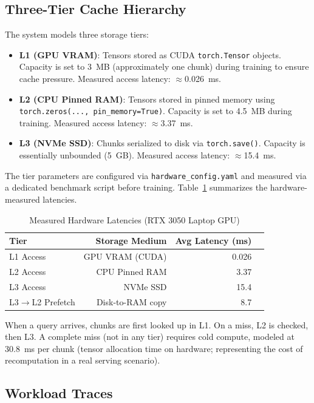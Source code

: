 \documentclass[conference]{IEEEtran}
\begin{document}
\subsection{Three-Tier Cache Hierarchy}

The system models three storage tiers:

\begin{itemize}
    \item \textbf{L1 (GPU VRAM)}: Tensors stored as CUDA \texttt{torch.Tensor} objects. Capacity is set to 3~MB (approximately one chunk) during training to ensure cache pressure. Measured access latency: $\approx$0.026~ms.
    \item \textbf{L2 (CPU Pinned RAM)}: Tensors stored in pinned memory using \texttt{torch.zeros(..., pin\_memory=True)}. Capacity is set to 4.5~MB during training. Measured access latency: $\approx$3.37~ms.
    \item \textbf{L3 (NVMe SSD)}: Chunks serialized to disk via \texttt{torch.save()}. Capacity is essentially unbounded (5~GB). Measured access latency: $\approx$15.4~ms.
\end{itemize}

The tier parameters are configured via \texttt{hardware\_config.yaml} and measured via a dedicated benchmark script before training. Table~\ref{tab:latencies} summarizes the hardware-measured latencies.

\begin{table}[htbp]
\centering
\caption{Measured Hardware Latencies (RTX 3050 Laptop GPU)}
\label{tab:latencies}
\begin{tabular}{@{}lrrr@{}}
\toprule
\textbf{Tier} & \textbf{Storage Medium} & \textbf{Avg Latency (ms)} \\
\midrule
L1 Access & GPU VRAM (CUDA) & 0.026 \\
L2 Access & CPU Pinned RAM & 3.37 \\
L3 Access & NVMe SSD & 15.4 \\
L3$\rightarrow$L2 Prefetch & Disk-to-RAM copy & 8.7 \\
\bottomrule
\end{tabular}
\end{table}

When a query arrives, chunks are first looked up in L1. On a miss, L2 is checked, then L3. A complete miss (not in any tier) requires cold compute, modeled at 30.8~ms per chunk (tensor allocation time on hardware; representing the cost of recomputation in a real serving scenario).

\subsection{Workload Traces}
\end{document}
